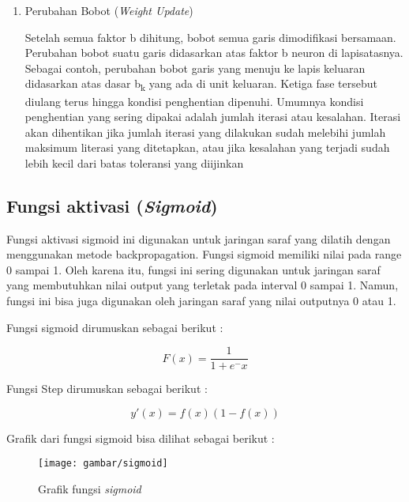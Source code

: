\begin{enumerate}
	\item Perubahan Bobot (\emph{Weight Update}) \par 
	Setelah semua faktor b dihitung, bobot semua garis dimodifikasi bersamaan.
	Perubahan bobot suatu garis didasarkan atas faktor b neuron di lapisatasnya. Sebagai
	contoh, perubahan bobot garis yang menuju ke lapis keluaran didasarkan atas dasar b\textsubscript{k}
	yang ada di unit keluaran. Ketiga fase tersebut diulang terus hingga kondisi penghentian
	dipenuhi. Umumnya kondisi penghentian yang sering dipakai adalah jumlah iterasi atau
	kesalahan. Iterasi akan dihentikan jika jumlah iterasi yang dilakukan sudah melebihi
	jumlah maksimum literasi yang ditetapkan, atau jika kesalahan yang terjadi sudah lebih
	kecil dari batas toleransi yang diijinkan
	
\end{enumerate}

\subsection{Fungsi aktivasi (\emph{Sigmoid})}
Fungsi aktivasi sigmoid ini digunakan untuk jaringan saraf yang dilatih
dengan menggunakan metode backpropagation. Fungsi sigmoid memiliki nilai pada
range 0 sampai 1. Oleh karena itu, fungsi ini sering digunakan untuk jaringan saraf
yang membutuhkan nilai output yang terletak pada interval 0 sampai 1. Namun,
fungsi ini bisa juga digunakan oleh jaringan saraf yang nilai outputnya 0 atau 1. \par 
Fungsi sigmoid dirumuskan sebagai berikut :
\begin{center}
	$$ F(x) =  \frac{\mathrm{1} }{\mathrm{1} + e^-x }  $$ 
\end{center}

\newpage
\par 
Fungsi Step dirumuskan sebagai berikut : 
\begin{center}
	$$  𝑦′(𝑥) = 𝑓(𝑥)(1 − 𝑓(𝑥)) $$
\end{center}
\par 
Grafik dari fungsi sigmoid bisa dilihat sebagai berikut : 
\begin{figure}[H]
	\centering
	\texttt{[image: gambar/sigmoid]}
	\caption{Grafik fungsi \emph{sigmoid}\protect\footnotemark}
	\label{JST-2}
\end{figure}

\begin{comment}

\end{comment}
